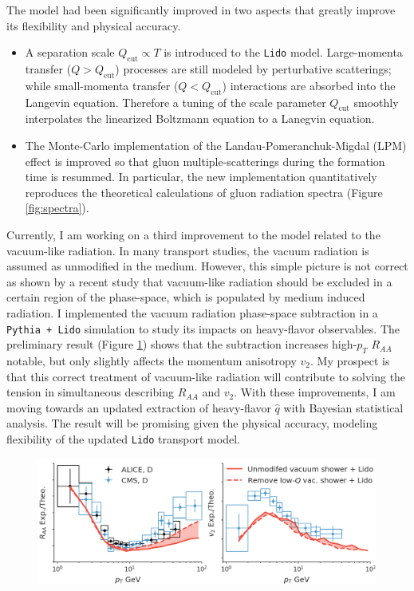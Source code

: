 \documentclass[12pt,a4paper]{article}
\begin{document}
The model had been significantly improved in two aspects that greatly improve its flexibility and physical accuracy.
\begin{itemize}
\item[1.] A separation scale $Q_{\textrm{cut}}\propto T$ is introduced to the {\tt Lido} model. 
Large-momenta transfer ($Q > Q_{\textrm{cut}}$) processes are still modeled by perturbative scatterings; while small-momenta transfer ($Q < Q_{\textrm{cut}}$) interactions are absorbed into the Langevin equation. 
Therefore a tuning of the scale parameter $Q_{\textrm{cut}}$ smoothly interpolates the linearized Boltzmann equation to a Lanegvin equation.
\item[2.] The Monte-Carlo implementation of the Landau-Pomeranchuk-Migdal (LPM) effect is improved so that gluon multiple-scatterings during the formation time is resummed. 
In particular, the new implementation quantitatively reproduces the theoretical calculations of gluon radiation spectra (Figure \ref{fig:spectra}).
\end{itemize}

Currently, I am working on a third improvement to the model related to the vacuum-like radiation. 
In many transport studies, the vacuum radiation is assumed as unmodified in the medium.
However, this simple picture is not correct as shown by a recent study \cite{Caucal:2018dla} that vacuum-like radiation should be excluded in a certain region of the phase-space, which is populated by medium induced radiation.
I implemented the vacuum radiation phase-space subtraction in a {\tt Pythia + Lido} simulation to study its impacts on heavy-flavor observables.
The preliminary result (Figure \ref{fig:prelim}) shows that the subtraction increases high-$p_T$ $R_{AA}$ notable, but only slightly affects the momentum anisotropy $v_2$.
My prospect is that this correct treatment of vacuum-like radiation will contribute to solving the tension in simultaneous describing $R_{AA}$ and $v_2$.
With these improvements, I am moving towards an updated extraction of heavy-flavor $\hat{q}$ with Bayesian statistical analysis.
The result will be promising given the physical accuracy, modeling flexibility of the updated {\tt Lido} transport model.

\begin{figure}[ht]
\begin{center}
\includegraphics[width=.85\textwidth]{Lido_obs.png}
\caption{}\label{fig:prelim}
\end{center}
\end{figure}
\end{document}
